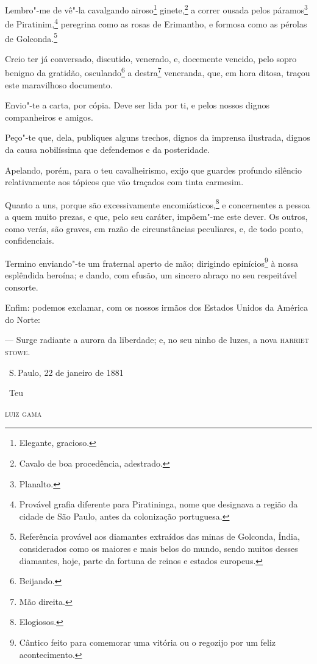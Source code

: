 Lembro"-me de vê"-la cavalgando airoso\footnote{Elegante, gracioso.}
ginete,\footnote{Cavalo de boa procedência, adestrado.} a correr
ousada pelos páramos\footnote{Planalto.} de Piratinim,\footnote{
  Provável grafia diferente para Piratininga, nome que designava a
  região da cidade de São Paulo, antes da colonização portuguesa.}
peregrina como as rosas de Erimantho, e formosa como as pérolas de
Golconda.\footnote{Referência provável aos diamantes extraídos das
  minas de Golconda, Índia, considerados como os maiores e mais belos do
  mundo, sendo muitos desses diamantes, hoje, parte da fortuna de reinos
  e estados europeus.}

Creio ter já conversado, discutido, venerado, e, docemente vencido, pelo
sopro benigno da gratidão, osculando\footnote{Beijando.} a
destra\footnote{Mão direita.} veneranda, que, em hora ditosa, traçou
este maravilhoso documento.

Envio"-te a carta, por cópia. Deve ser lida por ti, e pelos nossos dignos
companheiros e amigos.

Peço"-te que, dela, publiques alguns trechos, dignos da imprensa
ilustrada, dignos da causa nobilíssima que defendemos e da posteridade.

Apelando, porém, para o teu cavalheirismo, exijo que guardes profundo
silêncio relativamente aos tópicos que vão traçados com tinta carmesim.

Quanto a uns, porque são excessivamente encomiásticos,\footnote{
  Elogiosos.} e concernentes a pessoa a quem muito prezas, e que, pelo
seu caráter, impõem"-me este dever. Os outros, como verás, são graves, em
razão de circunstâncias peculiares, e, de todo ponto, confidenciais.

Termino enviando"-te um fraternal aperto de mão; dirigindo
epinícios\footnote{Cântico feito para comemorar uma vitória ou o
  regozijo por um feliz acontecimento.} à nossa esplêndida heroína; e
dando, com efusão, um sincero abraço no seu respeitável consorte.

Enfim: podemos exclamar, com os nossos irmãos dos Estados Unidos da
América do Norte:

--- Surge radiante a aurora da liberdade; e, no seu ninho de luzes, a
nova \textsc{harriet stowe}.

\hfill\ S.\,Paulo, 22 de janeiro de 1881\smallskip

\hfill\ Teu

\hfill\textsc{luiz gama}

\asterisc
\pagebreak

